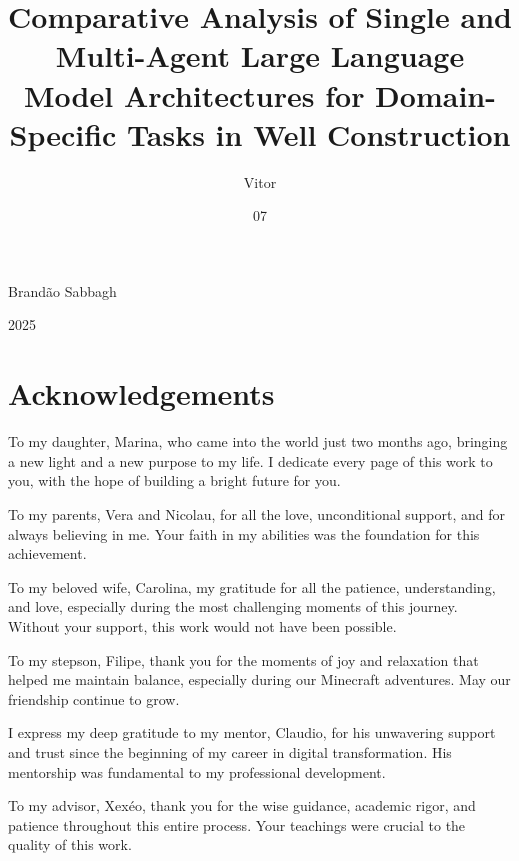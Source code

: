 \documentclass[msc,english]{coppe}
\begin{document}
\title{Comparative Analysis of Single and Multi-Agent Large Language Model Architectures for Domain-Specific Tasks in Well Construction}
\author{Vitor}{Brandão Sabbagh}

\date{07}{2025}


\maketitle

\frontmatter
\dedication{To Carolina, my life partner.}

\chapter*{Acknowledgements}

To my daughter, Marina, who came into the world just two months ago, bringing a new light and a new purpose to my life. I dedicate every page of this work to you, with the hope of building a bright future for you.

To my parents, Vera and Nicolau, for all the love, unconditional support, and for always believing in me. Your faith in my abilities was the foundation for this achievement.

To my beloved wife, Carolina, my gratitude for all the patience, understanding, and love, especially during the most challenging moments of this journey. Without your support, this work would not have been possible.

To my stepson, Filipe, thank you for the moments of joy and relaxation that helped me maintain balance, especially during our Minecraft adventures. May our friendship continue to grow.

I express my deep gratitude to my mentor, Claudio, for his unwavering support and trust since the beginning of my career in digital transformation. His mentorship was fundamental to my professional development.

To my advisor, Xexéo, thank you for the wise guidance, academic rigor, and patience throughout this entire process. Your teachings were crucial to the quality of this work.
\end{document}
